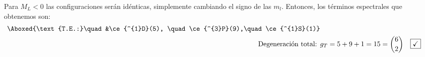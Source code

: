 Para $M_{L}<0$ las configuraciones serán 
idénticas, simplemente cambiando el signo de las $m_{l}$. 
Entonces, los términos espectrales que obtenemos son:
\begin{align*}
  \Aboxed{\text{T.E.:}\quad &\ce{^{1}D}(5), \quad \ce{^{3}P}(9),\quad \ce{^{1}S}(1)}\\ 
  \text{ Degeneración total: }&g_{T} = 5 + 9 + 1 = 15 = \binom{6}{2}\quad \boxed{\checkmark}
\end{align*}
